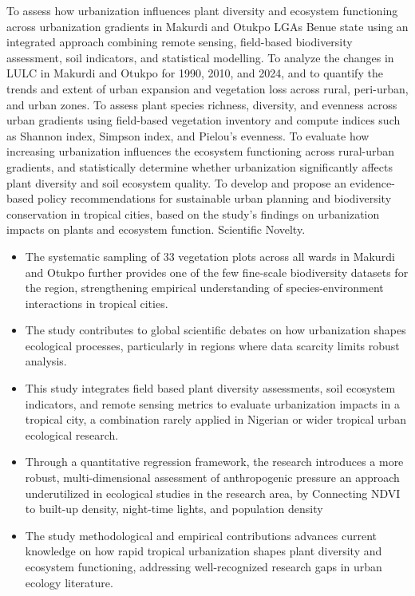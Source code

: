 To assess how urbanization influences plant diversity and ecosystem functioning across urbanization gradients in Makurdi and Otukpo LGAs Benue state using an integrated approach combining remote sensing, field-based biodiversity assessment, soil indicators, and statistical modelling.
To analyze the changes in LULC in Makurdi and Otukpo for 1990, 2010, and 2024, and to quantify the trends and extent of urban expansion and vegetation loss across rural, peri-urban, and urban zones.
To assess plant species richness, diversity, and evenness across urban gradients using field-based vegetation inventory and compute indices such as Shannon index, Simpson index, and Pielou's evenness.
To evaluate how increasing urbanization influences the ecosystem functioning across rural-urban gradients, and statistically determine whether urbanization significantly affects plant diversity and soil ecosystem quality.
To develop and propose an evidence-based policy recommendations for sustainable urban planning and biodiversity conservation in tropical cities, based on the study's findings on urbanization impacts on plants and ecosystem function.
Scientific Novelty.
\begin{itemize}
\item
  The systematic sampling of 33 vegetation plots across all wards in Makurdi and Otukpo further provides one of the few fine-scale biodiversity datasets for the region, strengthening empirical understanding of species-environment interactions in tropical cities.
\item
  The study contributes to global scientific debates on how urbanization shapes ecological processes, particularly in regions where data scarcity limits robust analysis.
\item
  This study integrates field based plant diversity assessments, soil ecosystem indicators, and remote sensing metrics to evaluate urbanization impacts in a tropical city, a combination rarely applied in Nigerian or wider tropical urban ecological research.
\item
  Through a quantitative regression framework, the research introduces a more robust, multi-dimensional assessment of anthropogenic pressure an approach underutilized in ecological studies in the research area, by Connecting NDVI to built-up density, night-time lights, and population density
\item
  The study methodological and empirical contributions advances current knowledge on how rapid tropical urbanization shapes plant diversity and ecosystem functioning, addressing well-recognized research gaps in urban ecology literature.
\end{itemize}

